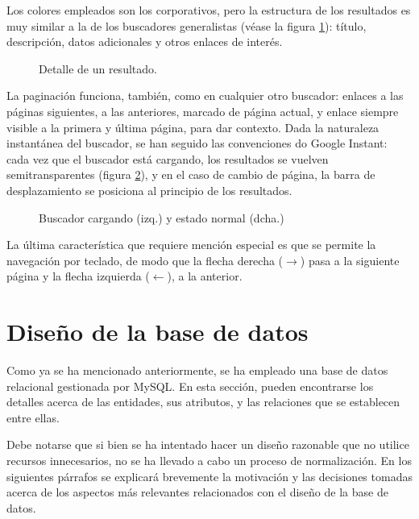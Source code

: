 Los colores empleados son los corporativos, pero la estructura de los resultados
es muy similar a la de los buscadores generalistas (véase la figura
\ref{fig:resultado_busqueda}): título, descripción, datos adicionales y otros
enlaces de interés.

\begin{figure}
\centering
{}
\caption{Detalle de un resultado.}
\label{fig:resultado_busqueda}
\end{figure}

La paginación funciona, también, como en cualquier otro buscador: enlaces a las
páginas siguientes, a las anteriores, marcado de página actual, y enlace
siempre visible a la primera y última página, para dar contexto. Dada la
naturaleza instantánea del buscador, se han seguido las convenciones do Google
Instant: cada vez que el buscador está cargando, los resultados se vuelven
semitransparentes (figura \ref{fig:buscador_cargando}), y en el caso de cambio
de página, la barra de desplazamiento se posiciona al principio de los
resultados.

\begin{figure}
\centering
{}
\caption{Buscador cargando (izq.) y estado normal (dcha.)}
\label{fig:buscador_cargando}
\end{figure}

La última característica que requiere mención especial es que se permite la
navegación por teclado, de modo que la flecha derecha ($\rightarrow$) pasa a la
siguiente página y la flecha izquierda ($\leftarrow$), a la anterior.

\section{Diseño de la base de datos}

Como ya se ha mencionado anteriormente, se ha empleado una base de datos
relacional gestionada por MySQL. En esta sección, pueden encontrarse los
detalles acerca de las entidades, sus atributos, y las relaciones que se
establecen entre ellas.

Debe notarse que si bien se ha intentado hacer un diseño razonable que no
utilice recursos innecesarios, no se ha llevado a cabo un proceso de
normalización. En los siguientes párrafos se explicará brevemente
la motivación y las decisiones tomadas acerca de los aspectos más relevantes
relacionados con el diseño de la base de datos.

